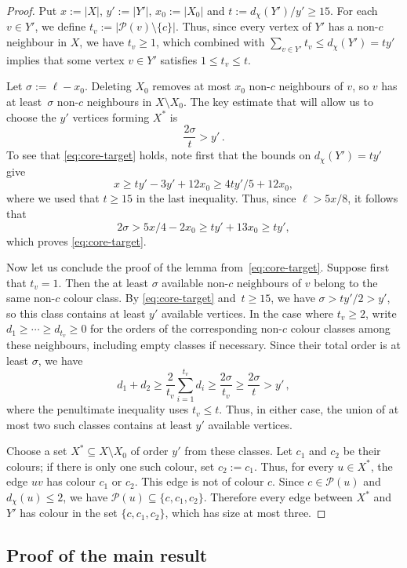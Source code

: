 \documentclass[a4paper,12pt,reqno]{amsart}
\newcommand{\cP}{\mathcal P}
\newcommand{\dd}{d_{\chi}}
\begin{document}
\begin{proof}
Put $x:=|X|$, $y':=|Y'|$, $x_0:=|X_0|$ and $t:=\dd(Y')/y'\geq 15$. For each
$v\in Y'$, we define $t_v:=|\cP(v)\setminus\{c\}|$. Thus, since every vertex of
$Y'$ has a non-$c$ neighbour in $X$, we have $t_v\ge1$, which combined with
$\sum_{v\in Y'}t_v\le\dd(Y')=ty'$ implies that some vertex $v\in Y'$ satisfies
$1\le t_v\le t$.

Let $\sigma:=\ell-x_0$. Deleting $X_0$ removes at most $x_0$ non-$c$ neighbours
of $v$, so $v$ has at least~$\sigma$ non-$c$ neighbours in $X\setminus X_0$.
The key estimate that will allow us to choose the $y'$ vertices forming $X^*$
is
\begin{equation}\label{eq:core-target}
  \frac{2\sigma}{t}>y'\,.
\end{equation}
To see that \eqref{eq:core-target} holds, note first that the bounds on
$\dd(Y')=ty'$ give
$$
x\ge ty'-3y'+12x_0\ge 4ty'/5+12x_0,
$$
where we used that $t\geq 15$ in the last inequality. Thus, since
$\ell>5x/8$, it follows that
$$2\sigma>5x/4-2x_0\ge ty'+13x_0\ge ty',
$$
which proves \eqref{eq:core-target}.

Now let us conclude the proof of the lemma from~\eqref{eq:core-target}. Suppose
first that $t_v=1$. Then the at least $\sigma$ available non-$c$ neighbours
of $v$ belong to the same non-$c$ colour class. By \eqref{eq:core-target} and~$t\ge15$, we have $\sigma>ty'/2>y'$, so this class contains at least $y'$
available vertices. In the case where $t_v\ge2$, write
$d_1\ge\cdots\ge d_{t_v}\ge0$ for
the orders of the corresponding non-$c$ colour classes among these neighbours,
including empty classes if necessary. Since their total order is at least
$\sigma$, we have
\[
  d_1+d_2
  \ge\frac{2}{t_v}\sum_{i=1}^{t_v}d_i
  \ge\frac{2\sigma}{t_v}
  \ge\frac{2\sigma}{t}
  >y'\,,
\]
where the penultimate inequality uses $t_v\le t$. Thus, in either case, the
union of at most two such classes contains at least $y'$ available vertices.

Choose a set $X^*\subseteq X\setminus X_0$ of order $y'$ from these classes.
Let $c_1$ and $c_2$ be their colours; if there is only one such colour, set
$c_2:=c_1$. Thus, for every $u\in X^*$, the edge $uv$ has colour $c_1$ or
$c_2$. This edge is not of colour $c$. Since $c\in\cP(u)$ and
$\dd(u)\le2$, we have
$\cP(u)\subseteq\{c,c_1,c_2\}$. Therefore every edge between $X^*$ and $Y'$
has colour in the set $\{c,c_1,c_2\}$, which has size at most three.
\end{proof}


\subsection{Proof of the main result}
\end{document}
